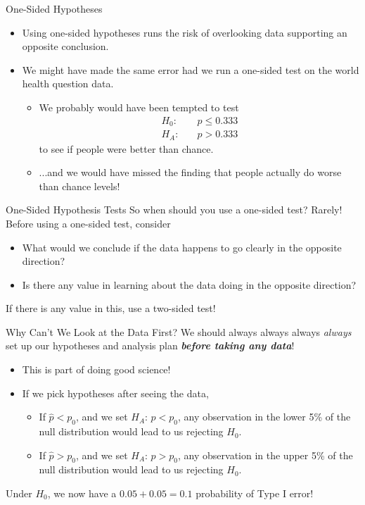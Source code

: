 \begin{frame}{One-Sided Hypotheses}
    \begin{itemize}
        \item Using one-sided hypotheses runs the risk of overlooking data supporting an opposite conclusion.
        \item We might have made the same error had we run a one-sided test on the world health question data.
        \begin{itemize}
            \item We probably would have been tempted to test 
            \begin{align*}
                H_0:& \quad p \le 0.333 \\
                H_A:& \quad p > 0.333
            \end{align*}
            to see if people were better than chance.
            \item ...and we would have missed the finding that people actually do worse than chance levels!
        \end{itemize}
    \end{itemize}
\end{frame}

\begin{frame}{One-Sided Hypothesis Tests}
    So when should you use a one-sided test? Rarely! Before using a one-sided test, consider
    \begin{itemize}
        \item What would we conclude if the data happens to go clearly in the opposite direction?
        \item Is there any value in learning about the data doing in the opposite direction?
    \end{itemize}
    If there is any value in this, use a two-sided test!
\end{frame}

\begin{frame}{Why Can't We Look at the Data First?}
    We should always always always \textit{always} set up our hypotheses and analysis plan \textit{\textbf{before taking any data}}!
    \begin{itemize}
        \item This is part of doing good science!
        \item If we pick hypotheses after seeing the data,
        \begin{itemize}
            \item If $\hat{p} < p_0$, and we set $H_A$: $p < p_0$, any observation in the lower 5\% of the null distribution would lead to us rejecting $H_0$.
            \item If $\hat{p} > p_0$, and we set $H_A$: $p > p_0$, any observation in the upper 5\% of the null distribution would lead to us rejecting $H_0$.
        \end{itemize}
    \end{itemize}
    Under $H_0$, we now have a $0.05+0.05 = 0.1$ probability of Type I error!
\end{frame}